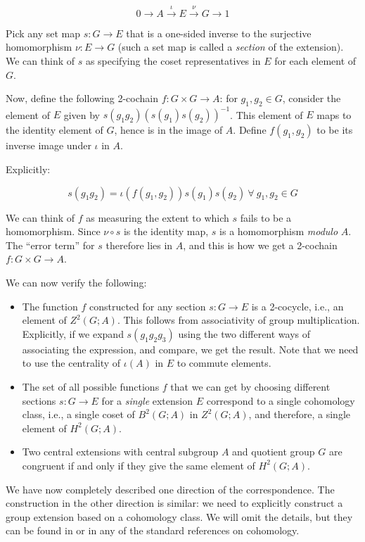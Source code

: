 $$0 \to A \stackrel{\iota}{\to} E \stackrel{\nu}{\to} G \to 1$$

Pick any set map $s:G \to E$ that is a one-sided inverse to the
surjective homomorphism $\nu: E \to G$ (such a set map is called a
{\em section} of the extension). We can think of $s$ as specifying the
coset representatives in $E$ for each element of $G$.

Now, define the following 2-cochain $f: G \times G \to A$: for
$g_1,g_2 \in G$, consider the element of $E$ given by
$s(g_1g_2)(s(g_1)s(g_2))^{-1}$. This element of $E$ maps to the
identity element of $G$, hence is in the image of $A$. Define
$f(g_1,g_2)$ to be its inverse image under $\iota$ in $A$.

Explicitly:

$$s(g_1g_2) = \iota(f(g_1,g_2))s(g_1)s(g_2) \ \forall \ g_1,g_2 \in G$$

We can think of $f$ as measuring the extent to which $s$ fails to be a
homomorphism. Since $\nu \circ s$ is the identity map, $s$ is a
homomorphism {\em modulo} $A$. The ``error term'' for $s$ therefore
lies in $A$, and this is how we get a 2-cochain $f: G \times G \to A$.

We can now verify the following:

\begin{itemize}
\item The function $f$ constructed for any section $s:G \to E$ is a
  2-cocycle, i.e., an element of $Z^2(G;A)$. This follows from
  associativity of group multiplication. Explicitly, if we expand
  $s(g_1g_2g_3)$ using the two different ways of associating the
  expression, and compare, we get the result. Note that we need to use
  the centrality of $\iota(A)$ in $E$ to commute elements.
\item The set of all possible functions $f$ that we can get by
  choosing different sections $s :G \to E$ for a {\em single}
  extension $E$ correspond to a single cohomology class, i.e., a
  single coset of $B^2(G;A)$ in $Z^2(G;A)$, and therefore, a single
  element of $H^2(G;A)$.  
\item Two central extensions with central subgroup $A$ and quotient
  group $G$ are congruent if and only if they give the same element of
  $H^2(G;A)$.
\end{itemize}

We have now completely described one direction of the
correspondence. The construction in the other direction is similar: we
need to explicitly construct a group extension based on a cohomology
class. We will omit the details, but they can be found in
\cite{DummitFoote} or in any of the standard references on cohomology.

